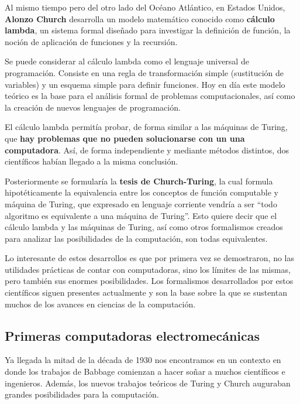 Al mismo tiempo pero del otro lado del Océano Atlántico, en Estados Unidos,
\textbf{Alonzo Church} desarrolla un modelo matemático conocido como
\textbf{cálculo lambda}, un sistema formal diseñado para investigar la
definición de función, la noción de aplicación de funciones y la recursión.

Se puede considerar al cálculo lambda como el lenguaje universal de
programación. Consiste en una regla de transformación simple (sustitución de
variables) y un esquema simple para definir funciones. Hoy en día este modelo
teórico es la base para el análisis formal de problemas computacionales, así
como la creación de nuevos lenguajes de programación.

El cálculo lambda permitía probar, de forma similar a las máquinas de Turing,
que \textbf{hay problemas que no pueden solucionarse con un una computadora}.
Así, de forma independiente y mediante métodos distintos, dos científicos habían
llegado a la misma conclusión.

 Posteriormente se formularía la \textbf{tesis de
Church-Turing}, la cual formula hipotéticamente la equivalencia entre los
conceptos de función computable y máquina de Turing, que expresado en lenguaje
corriente vendría a ser ``todo algoritmo es equivalente a una máquina de
Turing''. Esto quiere decir que el cálculo lambda y las máquinas de Turing, así
como otros formalismos creados para analizar las posibilidades de la
computación, son todas equivalentes.
\autocite[cap. 11]{petzold_2008}

Lo interesante de estos desarrollos es que por primera vez se demostraron, no
las utilidades prácticas de contar con computadoras, sino los límites de las
mismas, pero también sus enormes posibilidades. Los formalismos desarrollados
por estos científicos siguen presentes actualmente y son la base sobre la que se
sustentan muchos de los avances en ciencias de la computación.

\subsection{Primeras computadoras electromecánicas}
\label{chap:historia_computadoras:subsec:computadoras_electromecanicas}

Ya llegada la mitad de la década de 1930 nos encontramos en un contexto en donde
los trabajos de Babbage comienzan a hacer soñar a muchos científicos e
ingenieros. Además, los nuevos trabajos teóricos de Turing y Church auguraban
grandes posibilidades para la computación.


